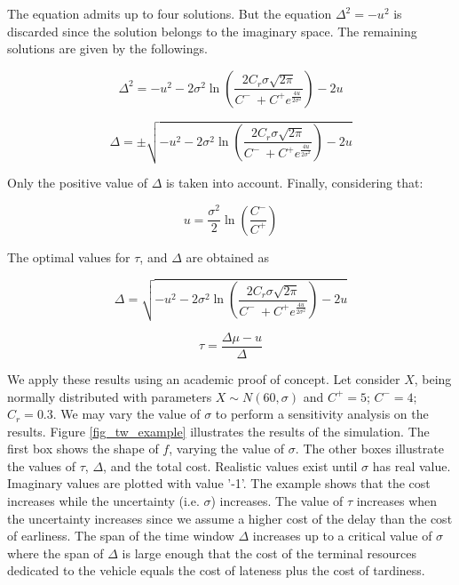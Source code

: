 The equation admits up to four solutions. But the equation $\Delta^2=-u^2$ is discarded since the solution belongs to the imaginary space. The remaining solutions are given by the followings.

\begin{equation}
    \Delta^2 = -u^2-2\sigma^2\ln{\left(\frac{2C_r\sigma\sqrt{2\pi}}{C^-\ +C^+e^\frac{4u}{2\sigma^2}}\right)}-2u
\end{equation}

\begin{equation}
    \Delta = \pm\sqrt{-u^2-2\sigma^2\ln{\left(\frac{2C_r\sigma\sqrt{2\pi}}{C^-\ +C^+e^\frac{4u}{2\sigma^2}}\right)}-2u}
\end{equation}

Only the positive value of $\Delta$ is taken into account. Finally, considering that:

\begin{equation}
    u=\frac{\sigma^2}{2}\ln{\left(\frac{C^-}{C^+}\right)}
\end{equation}

The optimal values for $\tau$, and $\Delta$ are obtained as

\begin{equation}
    \Delta = \sqrt{-u^2-2\sigma^2\ln{\left(\frac{2C_r\sigma\sqrt{2\pi}}{C^-\ +C^+e^\frac{4u}{2\sigma^2}}\right)}-2u}
\end{equation}

\begin{equation}
    \tau = \frac{\Delta\mu - u}{\Delta}
\end{equation}

We apply these results using an academic proof of concept. Let consider $X$, being normally distributed with parameters $X\sim N\left(60,\sigma\right)$ and $C^+=5$; $C^-=4$; $C_r=0.3$. We may vary the value of $\sigma$ to perform a sensitivity analysis on the results. Figure \ref{fig_tw_example} illustrates the results of the simulation. The first box shows the shape of $f$, varying the value of $\sigma$. The other boxes illustrate the values of $\tau$, $\Delta$, and the total cost. Realistic values exist until $\sigma$ has real value. Imaginary values are plotted with value '-1'. The example shows that the cost increases while the uncertainty (i.e. $\sigma$) increases. The value of $\tau$ increases when the uncertainty increases since we assume a higher cost of the delay than the cost of earliness. The span of the time window $\Delta$ increases up to a critical value of $\sigma$ where the span of $\Delta$ is large enough that the cost of the terminal resources dedicated to the vehicle equals the cost of lateness plus the cost of tardiness.



